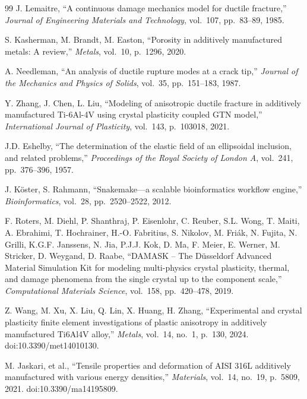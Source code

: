 \documentclass[twocolumn]{sagej}
\begin{document}
\begin{thebibliography}{99}
J. Lemaitre, ``A continuous damage mechanics model for ductile fracture,'' \textit{Journal of Engineering Materials and Technology}, vol.~107, pp.~83--89, 1985.

S. Kasherman, M. Brandt, M. Easton, ``Porosity in additively manufactured metals: A review,'' \textit{Metals}, vol.~10, p.~1296, 2020.

A. Needleman, ``An analysis of ductile rupture modes at a crack tip,'' \textit{Journal of the Mechanics and Physics of Solids}, vol.~35, pp.~151--183, 1987.

Y. Zhang, J. Chen, L. Liu, ``Modeling of anisotropic ductile fracture in additively manufactured Ti-6Al-4V using crystal plasticity coupled GTN model,'' \textit{International Journal of Plasticity}, vol.~143, p.~103018, 2021.

J.D. Eshelby, ``The determination of the elastic field of an ellipsoidal inclusion, and related problems,'' \textit{Proceedings of the Royal Society of London A}, vol.~241, pp.~376--396, 1957.

J. K\"{o}ster, S. Rahmann, ``Snakemake---a scalable bioinformatics workflow engine,'' \textit{Bioinformatics}, vol.~28, pp.~2520--2522, 2012.

F. Roters, M. Diehl, P. Shanthraj, P. Eisenlohr, C. Reuber, S.L. Wong, T. Maiti, A. Ebrahimi, T. Hochrainer, H.-O. Fabritius, S. Nikolov, M. Fri\'{a}k, N. Fujita, N. Grilli, K.G.F. Janssens, N. Jia, P.J.J. Kok, D. Ma, F. Meier, E. Werner, M. Stricker, D. Weygand, D. Raabe, ``DAMASK -- The D\"{u}sseldorf Advanced Material Simulation Kit for modeling multi-physics crystal plasticity, thermal, and damage phenomena from the single crystal up to the component scale,'' \textit{Computational Materials Science}, vol.~158, pp.~420--478, 2019.

Z. Wang, M. Xu, X. Liu, Q. Lin, X. Huang, H. Zhang, ``Experimental and crystal plasticity finite element investigations of plastic anisotropy in additively manufactured Ti6Al4V alloy,'' \textit{Metals}, vol.~14, no.~1, p.~130, 2024. doi:10.3390/met14010130.

M. Jaskari, et al., ``Tensile properties and deformation of AISI 316L additively manufactured with various energy densities,'' \textit{Materials}, vol.~14, no.~19, p.~5809, 2021. doi:10.3390/ma14195809.


\end{thebibliography}
\end{document}
